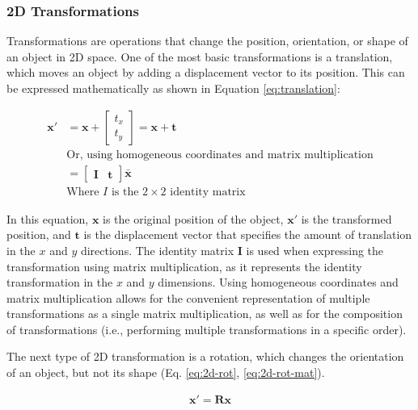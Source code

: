 \subsubsection{2D Transformations}
Transformations are operations that change the position, orientation, or shape of an object in 2D space. One of the most basic transformations is a translation, which moves an object by adding a displacement vector to its position. This can be expressed mathematically as shown in Equation \ref{eq:translation}:

\begin{equation}
    \begin{aligned}
        \mathbf{x'} &= \mathbf{x} + \begin{bmatrix}
            t_x \\ t_y
        \end{bmatrix} = \mathbf{x} + \mathbf{t}\\
        &\text{Or, using homogeneous coordinates and matrix multiplication} \\
        &= \begin{bmatrix}
            \mathbf{I} & \mathbf{t}
        \end{bmatrix}\bar{\mathbf{x}} \\
        &\text{Where $I$ is the $2 \times 2$ identity matrix}
    \end{aligned}
    \label{eq:translation}
\end{equation}

In this equation, $\mathbf{x}$ is the original position of the object, $\mathbf{x'}$ is the transformed position, and $\mathbf{t}$ is the displacement vector that specifies the amount of translation in the $x$ and $y$ directions. The identity matrix $\mathbf{I}$ is used when expressing the transformation using matrix multiplication, as it represents the identity transformation in the $x$ and $y$ dimensions. Using homogeneous coordinates and matrix multiplication allows for the convenient representation of multiple transformations as a single matrix multiplication, as well as for the composition of transformations (i.e., performing multiple transformations in a specific order).

The next type of 2D transformation is a rotation, which changes the orientation of an object, but not its shape (Eq. \ref{eq:2d-rot}, \ref{eq:2d-rot-mat}). 

\begin{equation}
    \begin{aligned}
        \mathbf{x}' = \mathbf{Rx}
    \end{aligned}
    \label{eq:2d-rot}
\end{equation}

